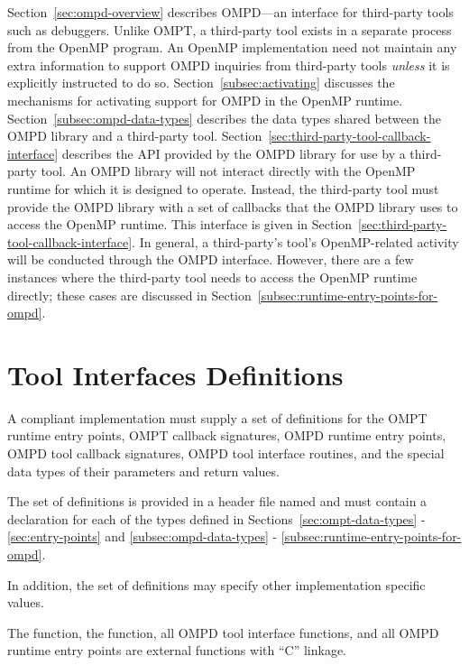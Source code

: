 Section~\ref{sec:ompd-overview} describes
OMPD---an interface for  third-party tools such as debuggers.
Unlike OMPT, a third-party tool exists in a separate process from
the OpenMP program.
An OpenMP implementation need not maintain any extra information to support OMPD inquiries from third-party tools
\emph{unless} it is explicitly instructed to do so.
Section~\ref{subsec:activating} discusses the mechanisms for
activating support for OMPD in the OpenMP runtime.
Section~\ref{subsec:ompd-data-types}  describes the data types shared between the OMPD library and a third-party tool.
Section~\ref{sec:third-party-tool-callback-interface} describes the API provided by the OMPD library for use by a third-party tool.
An OMPD library will not interact directly with the OpenMP
runtime for which it is designed to operate.
Instead, the third-party tool must provide the OMPD library with a set of
callbacks that the OMPD library uses to access the OpenMP runtime.
This interface is given in
Section~\ref{sec:third-party-tool-callback-interface}.
In general, a third-party's tool's OpenMP-related activity will be
conducted through the OMPD interface.
However, there are a few instances where the third-party tool needs
to access the OpenMP runtime directly;
these cases are discussed in
Section~\ref{subsec:runtime-entry-points-for-ompd}.

\section{Tool Interfaces Definitions}
\label{sec:tool_interfaces_definitions}

\begin{ccppspecific}

A compliant implementation must supply a set of definitions for the OMPT runtime entry 
points, OMPT callback signatures, OMPD runtime entry points, OMPD tool callback 
signatures, OMPD tool interface routines, and the special data types of their parameters 
and return values.

The set of definitions is provided in a header file named  and must 
contain a declaration for each of the types defined in 
Sections~\ref{sec:ompt-data-types} - \ref{sec:entry-points} and
\ref{subsec:ompd-data-types} - \ref{subsec:runtime-entry-points-for-ompd}. 

In addition, the set of definitions may specify other implementation specific values.

The  function, the  function, all OMPD 
tool interface functions, and all OMPD runtime entry points are external functions with 
``C'' linkage.
	
			
\end{ccppspecific}











